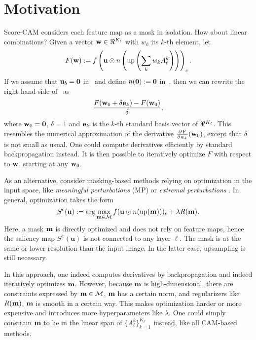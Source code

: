 \section{Motivation}
\label{sec:oc_motiv}

Score-CAM considers each feature map as a mask in isolation. How about linear combinations?
Given a vector $\vw \in \real^{K_\ell}$ with $w_k$ its $k$-th element, let
\begin{equation}
	F(\mathbf{w}) \mathrel{:=} f \left( \mathbf{u} \odot n \left( \operatorname{up} \left(
		\displaystyle\sum_k w_k A^k_\ell
	\right) \right) \right)_c.
\label{eq:s-obj}
\end{equation}
If we assume that $\mathbf{u}_b = \mathbf{0}$ in~ and define $n(\mathbf{0}) \mathrel{:=} \mathbf{0}$ 
in~, then we can rewrite the right-hand side of~ as
\begin{equation}	
	\frac{F(\mathbf{w}_0 + \delta \mathbf{e}_k) - F(\mathbf{w}_0)}{\delta},
\label{eq:s-cam2}
\end{equation}
where $\mathbf{w}_0 = \mathbf{0}$, $\delta = 1$ and $\mathbf{e}_k$ is the $k$-th standard basis vector of 
$\real^{K_\ell}$. This resembles the numerical approximation of the derivative $\frac{\partial^{}{F}}{\partial{{w_k}^{}}}(\mathbf{w}_0)$,
 except that $\delta$ is not small as usual. One could compute derivatives efficiently by 
 standard backpropagation instead. It is then possible to iteratively optimize $F$ with respect
  to $\mathbf{w}$, starting at any $\mathbf{w}_0$.

As an alternative, consider masking-based methods relying on optimization in the input space, 
like \emph{meaningful perturbations} (MP) \parencite{fong2017interpretable} or 
\emph{extremal perturbations} \parencite{fong2019understanding}. In general, optimization takes the form
\begin{equation}
	S^c(\mathbf{u}) \mathrel{:=} \arg\max_{\mathbf{m} \in \mathcal{M}} f(\mathbf{u} \odot n(\operatorname{up}(\mathbf{m})))_c + \lambda R(\mathbf{m}).
\label{eq:mask}
\end{equation}
Here, a mask $\mathbf{m}$ is directly optimized and does not rely on feature maps, hence the saliency 
map $S^x(\mathbf{u})$ is not connected to any layer $\ell$. The mask is at the same or lower resolution 
than the input image. In the latter case, upsampling is still necessary.

In this approach, one indeed computes derivatives by backpropagation and indeed iteratively 
optimizes $\mathbf{m}$. However, because $\mathbf{m}$ is high-dimensional, there are constraints expressed by 
$\mathbf{m} \in \mathcal{M}$, \eg $\mathbf{m}$ has a certain norm, and regularizers like $R(\mathbf{m})$, \eg $\mathbf{m}$ is smooth in a 
certain way. This makes optimization harder or more expensive and introduces more hyperparameters 
like $\lambda$. One could simply constrain $\mathbf{m}$ to lie in the linear span of $\{A_\ell^k\}_{k=1}
^{K_\ell}$ instead, like all CAM-based methods.

